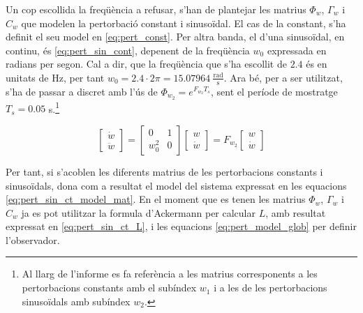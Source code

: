 \documentclass[12pt,a4paper,final,twoside,openright]{report}
\begin{document}
\vspace{100pt}
Un cop escollida la freqüència a refusar, s'han de plantejar les matrius $\Phi_w$, $\Gamma_w$ i $C_w$ que modelen la pertorbació constant i sinusoïdal. El cas de la constant, s'ha definit el seu model en \eqref{eq:pert_const}. Per altra banda, el d'una sinusoïdal, en continu, és \eqref{eq:pert_sin_cont}, depenent de la freqüència $w_0$ expressada en radians per segon. Cal a dir, que la freqüència que s'ha escollit de $2.4$ és en unitats de Hz, per tant $w_0=2.4\cdot2\pi = 15.07964~\mathrm{\frac{rad}{s}}$. Ara bé, per a ser utilitzat, s'ha de passar a discret amb l'ús de $\Phi_{w_2}=e^{F_{w_2} T_s}$, sent el període de mostratge $T_s=0.05$ s.\footnote{Al llarg de l'informe es fa referència a les matrius corresponents a les pertorbacions constants amb el subíndex $w_1$ i a les de les pertorbacions sinusoïdals amb subíndex $w_2$.}

\begin{equation}\label{eq:pert_sin_cont}
\begin{bmatrix}
\dot{w}\\
\ddot{w}
\end{bmatrix} = \begin{bmatrix}
0 & 1\\
w_0^2 & 0
\end{bmatrix} \begin{bmatrix}
w\\
\dot{w}
\end{bmatrix} = F_{w_2} \begin{bmatrix}
w\\
\dot{w}
\end{bmatrix}
\end{equation}

Per tant, si s'acoblen les diferents matrius de les pertorbacions constants i sinusoïdals, dona com a resultat el model del sistema expressat en les equacions \eqref{eq:pert_sin_ct_model_mat}. En el moment que es tenen les matrius $\Phi_w$, $\Gamma_w$ i $C_w$ ja es pot utilitzar la formula d'Ackermann per calcular $L$, amb resultat expressat en \eqref{eq:pert_sin_ct_L}, i les equacions \eqref{eq:pert_model_glob} per definir l'observador.
\end{document}
